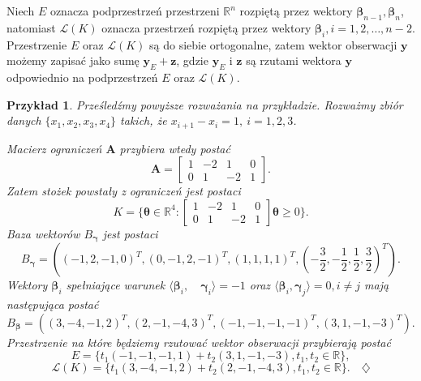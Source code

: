 \documentclass[12pt]{mwart}
\newtheorem{prz}{Przykład}
\begin{document}
Niech $E$ oznacza podprzestrzeń przestrzeni $\mathbb{R}^n$ rozpiętą przez wektory $\pmb{\beta}_{n-1},\pmb{\beta}_n$, natomiast $\mathcal{L}(K)$ oznacza przestrzeń rozpiętą przez wektory $\pmb{\beta}_i,i=1,2,\dots,n-2$. Przestrzenie $E$ oraz $\mathcal{L}(K)$ są do siebie ortogonalne, zatem wektor obserwacji $\mathbf{y}$ możemy zapisać jako sumę $\mathbf{y}_E + \mathbf{z}$, gdzie $\mathbf{y}_E$ i $\mathbf{z}$ są rzutami wektora $\mathbf{y}$ odpowiednio na podprzestrzeń $E$ oraz $\mathcal{L}(K)$.
\begin{prz}\label{stozek}
Prześledźmy powyższe rozważania na przykładzie. Rozważmy zbiór danych $\{x_1,x_2,x_3,x_4\}$ takich, że $x_{i+1}-x_i=1,\ i=1,2,3$.

Macierz ograniczeń $\pmb{A}$ przybiera wtedy postać 
\begin{displaymath}
\pmb{A}=\left[\begin{array}{cccc}1&-2&1&0\\0&1&-2&1
\end{array}\right].
\end{displaymath}
Zatem stożek powstały z ograniczeń jest postaci 
\begin{displaymath}
K=\{\pmb{\theta}\in \mathbb{R}^4\colon\left[\begin{array}{cccc}1&-2&1&0\\0&1&-2&1
\end{array}\right]\pmb{\theta} \geq 0\}.
\end{displaymath}
Baza wektorów $B_{\pmb{\gamma}}$ jest postaci 
\begin{displaymath}
B_{\pmb{\gamma}}=\left((-1,2,-1,0)^T,(0,-1,2,-1)^T,(1,1,1,1)^T,\left(-\frac{3}{2},-\frac{1}{2},\frac{1}{2},\frac{3}{2}\right)^T\right).
\end{displaymath}
Wektory $\pmb{\beta}_i$ spełniające warunek $\langle \pmb{\beta}_i,\quad \pmb{\gamma}_i\rangle=-1$ oraz $\langle \pmb{\beta}_i, \pmb{\gamma}_j\rangle =0, i\neq j$ mają następująca postać 
\begin{displaymath}
B_{\pmb{\beta}}=((3,-4,-1,2)^T,(2,-1,-4,3)^T,(-1,-1,-1,-1)^T,(3,1,-1,-3)^T).
\end{displaymath}
Przestrzenie na które będziemy rzutować wektor obserwacji przybierają postać
\begin{displaymath}
E=\{t_1(-1,-1,-1,1)+t_2(3,1,-1,-3),t_1,t_2\in \mathbb{R}\},
\end{displaymath}
\begin{displaymath}
\mathcal{L}(K)=\{t_1(3,-4,-1,2)+t_2(2,-1,-4,3),t_1,t_2\in \mathbb{R}\}. \quad \diamondsuit
\end{displaymath}
\end{prz}
\end{document}
